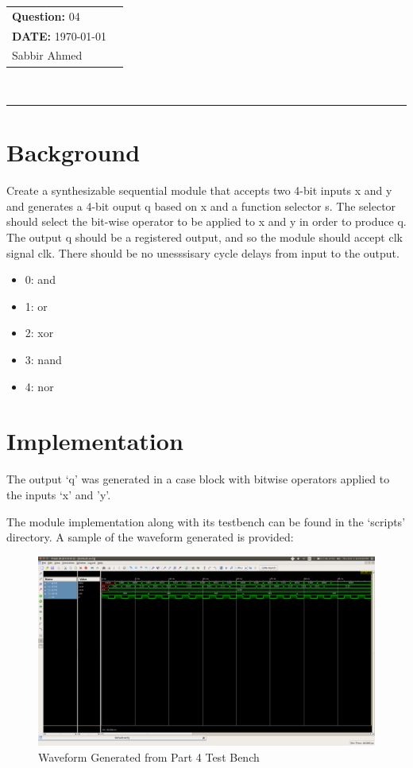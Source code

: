 \documentclass[paper=usletter, fontsize=12pt]{article}
\newcommand{\documentinfo}[3]{
    \begin{centering}
        \parbox{2in}{
        \begin{spacing}{1}
            \begin{flushleft}
                \begin{tabular}{l l}
                    #1 \\
                    #2 \\
                    #3 \\
                \end{tabular}\\
                \rule{\textwidth}{1pt}
            \end{flushleft}
        \end{spacing}
        }
    \end{centering}
}
\begin{document}
    \documentinfo{\textbf{Question:} 04}{\textbf{DATE:} \today}{Sabbir Ahmed}
    \vspace{-0.1in}

    \section{Background}
    Create a synthesizable sequential module that accepts two 4-bit inputs x and y and generates a 4-bit ouput q based on x and a function selector s. The selector should select the bit-wise operator to be applied to x and y in order to produce q. The output q should be a registered output, and so the module should accept clk signal clk. There should be no unesssisary cycle delays from input to the output.
    \begin{itemize}
        \item 0: and
        \item 1: or
        \item 2: xor
        \item 3: nand
        \item 4: nor
    \end{itemize}

    \section{Implementation}
    The output `q' was generated in a case block with bitwise operators applied to the inputs `x' and 'y'.

    The module implementation along with its testbench can be found in the `scripts' directory. A sample of the waveform generated is provided:

    \begin{figure}[ht]
        \begin{center}
            \includegraphics[width=1\textwidth]{wav.png}
            \caption{Waveform Generated from Part 4 Test Bench} \label{fig:wav}
        \end{center}
    \end{figure}
\end{document}
